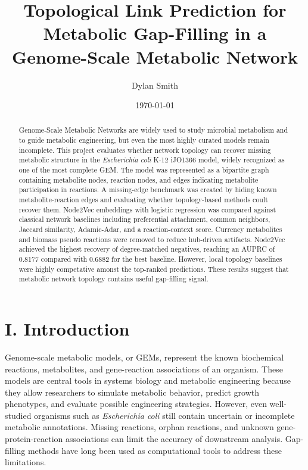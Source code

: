 \documentclass[reprint,preprintnumbers,amsmath,amssymb,aps,nofootinbib,showkeys]{revtex4-2}
\begin{document}

\title{Topological Link Prediction for Metabolic Gap-Filling in a Genome-Scale Metabolic Network}
\author{Dylan Smith}
\date{\today}

\begin{abstract}
    Genome-Scale Metabolic Networks are widely used to study microbial metabolism and to guide metabolic engineering, but even the most highly curated models remain incomplete. This project evaluates whether network topology can recover missing metabolic structure in the \textit{Escherichia coli} K-12 iJO1366 model, widely recognized as one of the most complete GEM. The model was represented as a bipartite graph containing metabolite nodes, reaction nodes, and edges indicating metabolite participation in reactions. A missing-edge benchmark was created by hiding known metabolite-reaction edges and evaluating whether topology-based methods coult recover them. Node2Vec embeddings with logistic regression was compared against classical network baselines including preferential attachment, common neighbors, Jaccard similarity, Adamic-Adar, and a reaction-context score. Currency metabolites and biomass pseudo reactions were removed to reduce hub-driven artifacts. Node2Vec achieved the highest recovery of degree-matched negatives, reaching an AUPRC of 0.8177 compared with 0.6882 for the best baseline. However, local topology baselines were highly competative amonst the top-ranked predictions. These results suggest that metabolic network topology contains useful gap-filling signal. 
    \end{abstract}


\maketitle


\section{I. Introduction}
    Genome-scale metabolic models, or GEMs, represent the known biochemical reactions, metabolites, and gene-reaction associations of an organism. These models are central tools in systems biology and metabolic engineering because they allow researchers to simulate metabolic behavior, predict growth phenotypes, and evaluate possible engineering strategies. However, even well-studied organisms such as \textit{Escherichia coli} still contain uncertain or incomplete metabolic annotations. Missing reactions, orphan reactions, and unknown gene-protein-reaction associations can limit the accuracy of downstream analysis. Gap-filling methods have long been used as computational tools to address these limitations.
    
\end{document}
